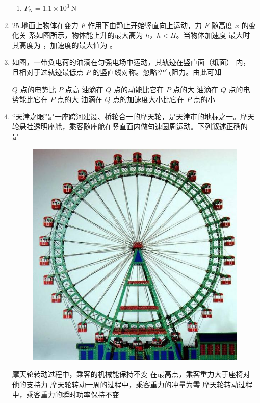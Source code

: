 \begin{enumerate}
{\begin{enumerate}
\item 
$F_{\mathrm{N}}=1.1 \times 10^{3} \ \mathrm{N}$

\end{enumerate}


}





\item
{}
$ 25 $.地面上物体在变力 $ F $ 作用下由静止开始竖直向上运动，力 $ F $ 随高度 $ x $ 的变化关
系如图所示，物体能上升的最大高为 $ h $，$ h<H $。当物体加速度
最大时其高度为
，加速度的最大值为
。
\begin{figure}[h!]
\centering

\end{figure}





\newpage
\item
{}
如图，一带负电荷的油滴在匀强电场中运动，其轨迹在竖直面（纸面）
内，且相对于过轨迹最低点 $ P $ 的竖直线对称。忽略空气阻力。由此可知  
\begin{figure}[h!]
\centering

\end{figure}




\fourchoices
{$ Q $ 点的电势比 $ P $ 点高}
{油滴在 $ Q $ 点的动能比它在 $ P $ 点的大}
{油滴在 $ Q $ 点的电势能比它在 $ P $ 点的大}
{油滴在 $ Q $ 点的加速度大小比它在 $ P $ 点的小}




\item
{}
“天津之眼”是一座跨河建设、桥轮合一的摩天轮，是天津市的地标之一。摩天
轮悬挂透明座舱，乘客随座舱在竖直面内做匀速圆周运动。下列叙述正确的
是  
\begin{figure}[h!]
\centering
\includegraphics[width=0.2\linewidth]{picture/screenshot028}
\end{figure}

\fourchoices
{摩天轮转动过程中，乘客的机械能保持不变}
{在最高点，乘客重力大于座椅对他的支持力}
{摩天轮转动一周的过程中，乘客重力的冲量为零}
{摩天轮转动过程中，乘客重力的瞬时功率保持不变}



\end{enumerate}
